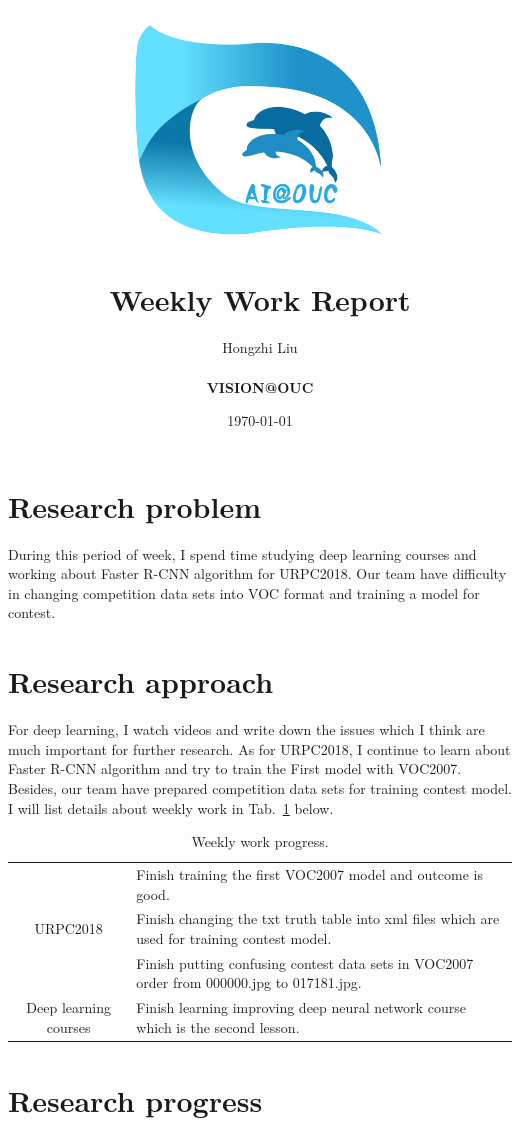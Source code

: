 \documentclass[a4paper]{article}
\title{
    \vspace*{1in}
    \includegraphics[width=2.75in]{figures/zhenglab-logo} \\
    \vspace*{1.2in}
    \textbf{\huge Weekly Work Report}
    \vspace{0.2in}
}
\author{Hongzhi Liu \\
    \vspace*{0.5in} \\
    \textbf{VISION@OUC} \\
    \vspace*{1in}
}
\date{\today}
\begin{document}
\par
\maketitle
\setcounter{page}{0}
\thispagestyle{empty}
\newpage


\section{Research problem}

During this period of week, I spend time studying deep learning courses and working about Faster R-CNN algorithm for URPC2018. Our team have difficulty in changing competition data sets into VOC format and training a model for contest.

\section{Research approach}

For deep learning, I watch videos and write down the issues which I think are much important for further research. As for URPC2018, I continue to learn about Faster R-CNN algorithm \cite{Ren2015Faster} and try to train the First model with VOC2007. Besides, our team have prepared competition data sets for training contest model. I will list details about weekly work in Tab.~\ref{t2} below.
\begin{table}[hb]
	\centering
	\caption{Weekly work progress.}
	\begin{tabular}{c|p{10cm}}
		\hline 
		 & Finish training the first VOC2007 model and outcome is good.    \\
		
		 URPC2018 & Finish changing the txt truth table into xml files which are used for training contest model.\\
		 
		 & Finish putting confusing contest data sets in VOC2007 order from 000000.jpg to 017181.jpg.\\
		\hline
		Deep learning courses & Finish learning improving deep neural network course which is the second lesson.\\
		\hline
	\end{tabular}
	\label{t2}
\end{table} 

\section{Research progress}
\end{document}
